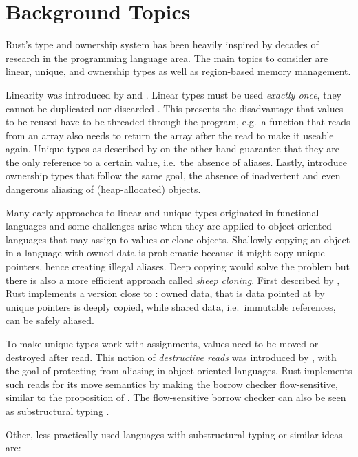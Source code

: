 \section{Background Topics}

Rust's type and ownership system has been heavily inspired by decades of
research in the programming language area. The main topics to consider are
linear, unique, and ownership types as well as region-based memory management.

Linearity was introduced by \citet{girard} and \citet{Wadler90lineartypes}.
Linear types must be used \emph{exactly once}, they cannot be duplicated nor
discarded \cite{use-once}. This presents the disadvantage that values to be
reused have to be threaded through the program, e.g.~a function that reads from
an array also needs to return the array after the read to make it useable again.
Unique types as described by \citet*{alias-free-pointers} on the other hand
guarantee that they are the only reference to a certain value, i.e.~the absence
of aliases. Lastly, \citet*{ownership-types} introduce ownership types that
follow the same goal, the absence of inadvertent and even dangerous aliasing of
(heap-allocated) objects.

Many early approaches to linear and unique types originated in functional
languages and some challenges arise when they are applied to object-oriented
languages that may assign to values or clone objects. Shallowly copying an
object in a language with owned data is problematic because it might copy unique
pointers, hence creating illegal aliases. Deep copying would solve the problem
but there is also a more efficient approach called \emph{sheep cloning}. First
described by \citet*{dynamic-alias-protection}, Rust implements a version close
to \cite{sheep-cloning}: owned data, that is data pointed at by unique pointers
is deeply copied, while shared data, i.e.~immutable references, can be safely
aliased.

To make unique types work with assignments, values need to be moved or destroyed
after read. This notion of \emph{destructive reads} was introduced by
\citet*{islands-alias-protection}, with the goal of protecting from aliasing in
object-oriented languages. Rust implements such reads for its move semantics by
making the borrow checker flow-sensitive, similar to the proposition of
\citet*{alias-burying}. The flow-sensitive borrow checker can also be seen as
substructural typing \cite{oxide}.

Other, less practically used languages with substructural typing or
similar ideas are:
